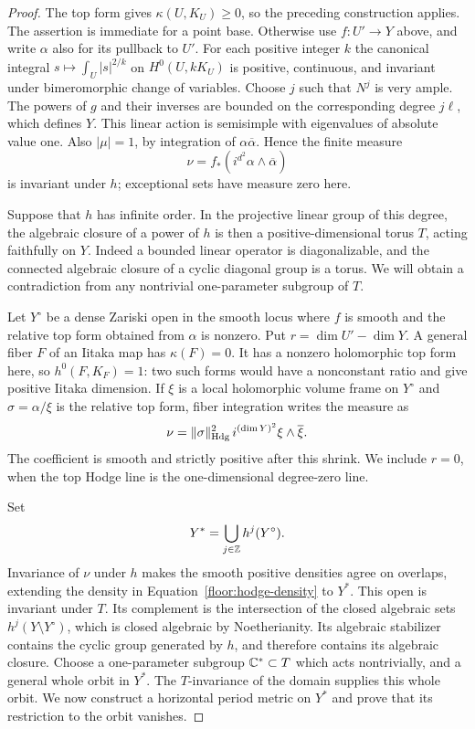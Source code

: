 \begin{proof}
The top form gives \(\kappa(U,K_U)\geq0\), so the preceding construction
applies.  The assertion is
immediate for a point base.  Otherwise use
\(f:U'\to Y\) above, and write \(\alpha\) also for its pullback to \(U'\).
For each positive integer \(k\) the
canonical integral \(s\mapsto\int_U|s|^{2/k}\) on \(H^0(U,kK_U)\) is
positive, continuous, and invariant under bimeromorphic change of variables.
Choose \(j\) such that \(N^j\) is very ample.  The powers of \(g\) and
their inverses are bounded on the corresponding degree \(j\ell\), which
defines \(Y\).  This linear action is semisimple with eigenvalues of
absolute value one.  Also \(|\mu|=1\), by integration of
\(\alpha\overline\alpha\).  Hence the finite measure
\[
 \nu=f_*(i^{d^2}\alpha\wedge\overline\alpha)
\]
is invariant under \(h\); exceptional sets have measure zero here.

Suppose that \(h\) has infinite order.  In the projective linear group of
this degree, the algebraic closure of a power of \(h\) is
then a positive-dimensional torus \(T\), acting faithfully on \(Y\).
Indeed a bounded linear operator is diagonalizable, and the connected
algebraic closure of a cyclic diagonal group is a torus.  We will obtain a
contradiction from any nontrivial one-parameter subgroup of \(T\).

Let \(Y^\circ\) be a dense Zariski open in the smooth locus where \(f\)
is smooth and the relative top form obtained from \(\alpha\) is nonzero.
Put \(r=\dim U'-\dim Y\).  A general fiber \(F\) of an Iitaka map has
\(\kappa(F)=0\).  It has a nonzero holomorphic top form here, so
\(h^0(F,K_F)=1\): two such forms would have a nonconstant ratio and give
positive Iitaka dimension.  If \(\xi\) is a local holomorphic volume
frame on \(Y^\circ\) and \(\sigma=\alpha/\xi\) is the relative top
form, fiber integration writes the measure as
\begin{equation}\label{floor:hodge-density}
 \nu=\|\sigma\|_{\rm Hdg}^{2}\,i^{(\dim Y)^2}\xi\wedge\overline\xi.
\end{equation}
The coefficient is smooth and strictly positive after this shrink.  We
include \(r=0\), when the top Hodge line is the one-dimensional degree-zero
line.

Set
\[
 Y^*=\bigcup_{j\in\mathbb Z}h^j(Y^\circ).
\]
Invariance of \(\nu\) under \(h\) makes the smooth positive densities
agree on overlaps, extending the density in
Equation~\eqref{floor:hodge-density} to \(Y^*\).
This open is invariant under \(T\).  Its complement is the
intersection of the closed algebraic sets \(h^j(Y\setminus Y^\circ)\),
which is closed algebraic by Noetherianity.  Its algebraic stabilizer
contains the cyclic group generated by \(h\), and therefore contains its
algebraic closure.  Choose a one-parameter subgroup \(\mathbb C^*\subset T\)
which acts nontrivially, and a general whole orbit in \(Y^*\).
The \(T\)-invariance of the domain supplies this whole orbit.  We now
construct a horizontal period metric on \(Y^*\) and prove that its
restriction to the orbit vanishes.


\end{proof}
